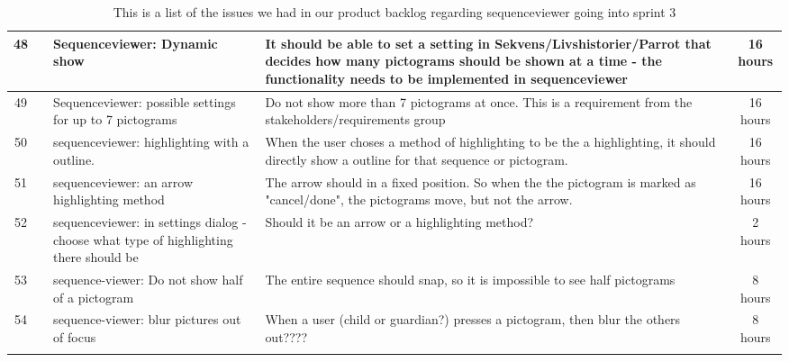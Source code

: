 \begin{longtable} { | c | c | p{5cm} | p{5cm} | c | } 
\hline
	48	&		 &	Sequenceviewer: Dynamic show	 &		It should be able to set a setting in Sekvens/Livshistorier/Parrot that decides how many pictograms should be shown at a time - the functionality needs to be implemented in sequenceviewer	 &	16 hours \\\hline
	49	&		 &	Sequenceviewer: possible settings for up to 7 pictograms		 &		Do not show more than 7 pictograms at once. This is a requirement from the stakeholders/requirements group			 & 	16 hours	\\\hline
	50	&		 &	sequenceviewer: highlighting with a outline.	 &	When the user choses a method of highlighting to be the a highlighting, it should directly show a outline for that sequence or pictogram.			 &	16 hours \\\hline
	51	&		 &	sequenceviewer: an arrow highlighting method	 &	The arrow should in a fixed position. So when the the pictogram is marked as "cancel/done", the pictograms move, but not the arrow.				 &	16 hours \\\hline
	52	&		 &	sequenceviewer: in settings dialog - choose what type of highlighting there should be		 &	Should it be an arrow or a highlighting method?	 &	2 hours \\\hline
	53	&		 &	sequence-viewer: Do not show half of a pictogram		 & 	The entire sequence should snap, so it is impossible to see half pictograms	 &	8 hours	\\\hline
	54	&		 &	sequence-viewer: blur pictures out of focus		 &	When a user (child or guardian?) presses a pictogram, then blur the others out????			 &	8 hours \\\hline
\caption{This is a list of the issues we had in our product backlog regarding sequenceviewer going into sprint 3}
\label{tab:spr3_sw_prodblog}
\end{longtable}

